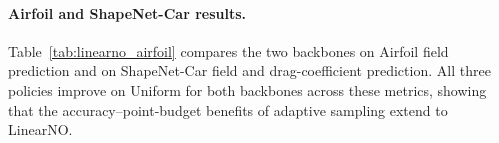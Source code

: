 \paragraph{Airfoil and ShapeNet-Car results.}
Table~\ref{tab:linearno_airfoil} compares the two backbones on Airfoil field
prediction and on ShapeNet-Car field and drag-coefficient prediction.
All three policies improve on Uniform for both backbones across these
metrics, showing that the accuracy--point-budget benefits of adaptive
sampling extend to LinearNO.


\FloatBarrier
